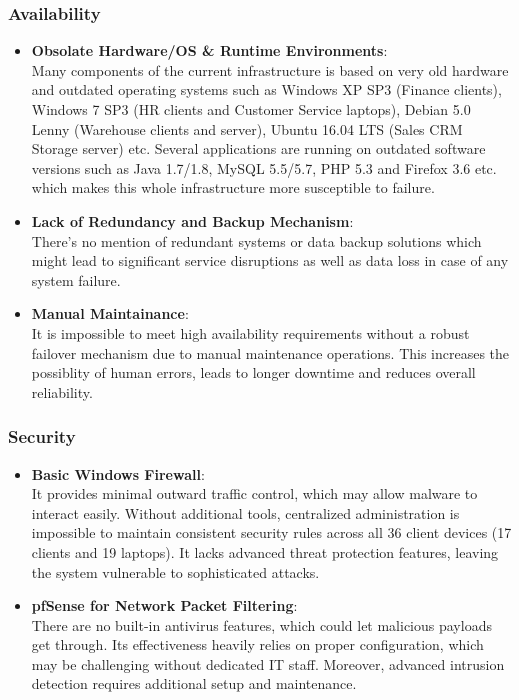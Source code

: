 \documentclass{llncs}
\begin{document}
\subsubsection*{Availability}
\begin{itemize}
  \item \textbf{Obsolate Hardware/OS \& Runtime Environments}:
        \\
        Many components of the current infrastructure is based on very old hardware and outdated operating systems such as 
        Windows XP SP3 (Finance clients), Windows 7 SP3 (HR clients and Customer Service laptops), Debian 5.0 Lenny (Warehouse clients and server),
        Ubuntu 16.04 LTS (Sales CRM Storage server) etc. Several applications are running on outdated software versions such as Java 1.7/1.8, 
        MySQL 5.5/5.7, PHP 5.3 and Firefox 3.6 etc. which makes this whole infrastructure more susceptible to failure.
        \\
  \item \textbf{Lack of Redundancy and Backup Mechanism}:
        \\ 
        There's no mention of redundant systems or data backup solutions which might lead to significant service disruptions as well as data loss in case of any system failure.
        \\
  \item \textbf{Manual Maintainance}:
        \\It is impossible to meet high availability requirements without a robust failover mechanism due to manual maintenance operations. 
        This increases the possiblity of human errors, leads to longer downtime and reduces overall reliability.
        \\
\end{itemize}

\subsubsection*{Security}
\begin{itemize}
  \item \textbf{Basic Windows Firewall}:
        \\
        It provides minimal outward traffic control, which may allow malware to interact easily. 
        Without additional tools, centralized administration is impossible to maintain consistent security rules across all 36 client devices (17 clients and 19 laptops).
        It lacks advanced threat protection features, leaving the system vulnerable to sophisticated attacks.
        \\
  \item \textbf{pfSense for Network Packet Filtering}:
        \\ 
        There are no built-in antivirus features, which could let malicious payloads get through. Its effectiveness heavily relies on proper configuration, which may be challenging without dedicated IT staff.
        Moreover, advanced intrusion detection requires additional setup and maintenance.
        \\
        
\end{itemize}
\end{document}
